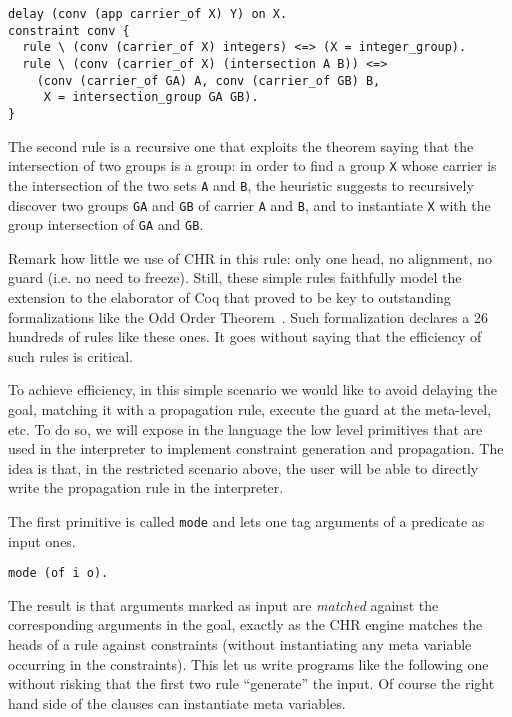 \documentclass{easychair}
\begin{document}
\begin{Verbatim}
delay (conv (app carrier_of X) Y) on X.
constraint conv {
  rule \ (conv (carrier_of X) integers) <=> (X = integer_group).
  rule \ (conv (carrier_of X) (intersection A B)) <=>
    (conv (carrier_of GA) A, conv (carrier_of GB) B,
     X = intersection_group GA GB).
}
\end{Verbatim}

The second rule is a recursive one that exploits the theorem saying
that the intersection of two groups is a group: in order to find a group \verb+X+ whose carrier is the intersection of the two sets \verb+A+ and \verb+B+, the heuristic suggests to recursively discover two groups \verb+GA+ and \verb+GB+ of carrier \verb+A+ and \verb+B+, and to instantiate \verb+X+ with the group intersection of \verb+GA+ and \verb+GB+.

Remark how little we use of CHR in this rule: only one head, no alignment,
no guard (i.e. no need to freeze).
Still, these simple rules faithfully model the extension to the elaborator
of Coq that proved to be key to outstanding formalizations like
the Odd Order Theorem~\cite{oothm}.  Such formalization declares a 26
hundreds of rules like these ones.  It goes without saying that
the efficiency of such rules is critical.

To achieve efficiency, in this simple scenario we would like to avoid delaying the goal, matching it with a propagation rule, execute the guard at the meta-level, etc. To do so, we will expose in the language the low level primitives that are used in the interpreter to implement constraint generation and propagation. The idea is that, in the restricted scenario above, the user will be able to directly write the propagation rule in the interpreter.

The first primitive is called \verb+mode+ and lets one tag arguments of
a predicate as input ones.

\begin{Verbatim}
mode (of i o).
\end{Verbatim}

The result is that arguments marked as input are \emph{matched}
against the corresponding arguments in the goal, exactly as the
CHR engine matches the heads of a rule against constraints (without
instantiating any meta variable occurring in the constraints).
This let us write programs like the following one without risking that
the first two rule ``generate'' the input.  Of course the right
hand side of the clauses can instantiate meta variables.
\end{document}
